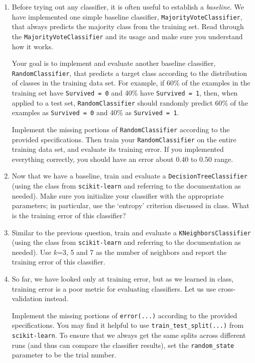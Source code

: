 \begin{enumerate}[resume]

\item {} Before trying out any classifier, it is often useful to establish a \emph{baseline}. We have implemented one simple baseline classifier, \verb|MajorityVoteClassifier|, that always predicts the majority class from the training set. Read through the \verb|MajorityVoteClassifier| and its usage and make sure you understand how it works.

Your goal is to implement and evaluate another baseline classifier, \verb|RandomClassifier|, that predicts a target class according to the distribution of classes in the training data set. For example, if 60\% of the examples in the training set have \verb|Survived = 0| and 40\% have \verb|Survived = 1|, then, when applied to a test set, \verb|RandomClassifier| should randomly predict 60\% of the examples as \verb|Survived = 0| and 40\% as \verb|Survived = 1|.

Implement the missing portions of \verb|RandomClassifier| according to the provided specifications. Then train your \verb|RandomClassifier| on the entire training data set, and evaluate its training error. If you implemented everything correctly, you should have an error about $0.40$ to $0.50$ range.

\item {} Now that we have a baseline, train and evaluate a \verb|DecisionTreeClassifier| (using the class from \verb|scikit-learn| and referring to the documentation as needed). Make sure you initialize your classifier with the appropriate parameters; in particular, use the `entropy' criterion discussed in class. What is the training error of this classifier?


\item {} Similar to the previous question, train and evaluate a \verb|KNeighborsClassifier| (using the class from \verb|scikit-learn| and referring to the documentation as needed). Use $k$=3, 5 and 7 as the number of neighbors and report the training error of this classifier.


\item {} So far, we have looked only at training error, but as we learned in class, training error is a poor metric for evaluating classifiers. Let us use cross-validation instead.

Implement the missing portions of \verb|error(...)| according to the provided specifications. You may find it helpful to use \verb|train_test_split(...)| from \verb|scikit-learn|. To ensure that we always get the same splits across different runs (and thus can compare the classifier results), set the \verb|random_state| parameter to be the trial number.



\end{enumerate}
